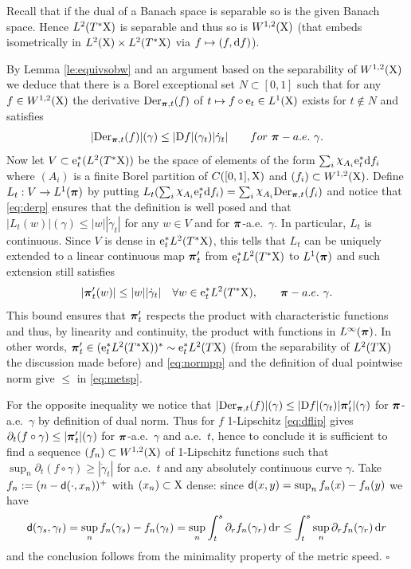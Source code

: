 \documentclass[11pt]{article}
\numberwithin{equation}{section}
\newenvironment{idea}{\removelastskip\par\medskip   %
\noindent{\em Idea of the proof} \rm}{\penalty-20\null\hfill$\square$\par\medbreak}
\newcommand{\ppi}{{\mbox{\boldmath$\pi$}}}
\newcommand{\sppi}{{\mbox{\scriptsize\boldmath$\pi$}}}
\newcommand{\e}{{\rm e}}
\newcommand{\X}{{\rm X}}
\newcommand{\sfd}{{\sf d}}
\renewcommand{\d}{{\rm d}}
\newcommand{\D}{{\rm D}}
\newcommand{\nchi}{{\raise.3ex\hbox{$\chi$}}}
\begin{document}
\begin{idea} Recall that if the dual of a Banach space is separable so is the given Banach space. Hence $L^2(T^*\X)$ is separable and thus so is $W^{1,2}(\X)$ (that embeds isometrically in $L^2(\X)\times L^2(T^*\X)$ via $f\mapsto(f,\d f)$). 

By Lemma \ref{le:equivsobw} and an argument based on the separability of $W^{1,2}(\X)$ we deduce that there is a Borel exceptional set $N\subset[0,1]$ such that for any $f\in W^{1,2}(\X)$ the derivative ${\rm Der}_{\sppi,t}(f)$ of   $t\mapsto f\circ\e_t \in L^1(\X)$  exists for $t\notin N$ and satisfies 
\begin{equation}
\label{eq:derp}
|{\rm Der}_{\sppi,t}(f)|(\gamma)\leq |\D f|(\gamma_t)|\dot\gamma_t|\qquad for\ \ppi-a.e.\ \gamma.
\end{equation}
Now let $V\subset \e_t^*(L^2(T^*\X))$ be the space of elements of the form $\sum_i\nchi_{A_i}\e_t^*\d f_i$ where $(A_i)$ is a finite Borel partition of $C([0,1],\X)$ and $(f_i)\subset W^{1,2}(\X)$. Define $L_t:V\to L^1(\ppi)$ by putting $L_t(\sum_i\nchi_{A_i}\e_t^*\d f_i)=\sum_i\nchi_{A_i}{\rm Der}_{\sppi,t}(f_i)$ and notice that \eqref{eq:derp} ensures that the definition is well posed and that  $|L_t(w)|(\gamma)\leq |w||\dot\gamma_t|$ for any $w\in V$ and  for $\ppi$-a.e.\ $\gamma$. In particular, $L_t$ is continuous. Since $V$ is dense in $\e_t^*L^2(T^*\X)$, this tells that $L_t$ can be uniquely extended to a linear continuous map $\ppi_t'$ from $\e_t^*L^2(T^*\X)$ to $L^1(\ppi)$ and such extension still satisfies 
\begin{equation}
\label{eq:normpp}
|\ppi_t'(w)|\leq |w||\dot\gamma_t|\quad \forall  w\in \e_t^*L^2(T^*\X),\qquad \ppi-a.e.\ \gamma. 
\end{equation}
This bound ensures that $\ppi'_t$ respects the product with characteristic functions and thus, by linearity and continuity, the product with functions in $L^\infty(\ppi)$. In other words, $\ppi_t'\in (\e_t^*L^2(T^*\X))^*\sim \e_t^*L^2(T\X)$ (from the separability of $L^2(T\X)$  the discussion made before) and \eqref{eq:normpp} and the definition of dual pointwise norm give  $\leq$ in \eqref{eq:metsp}.

For the opposite inequality we notice that $|{\rm Der}_{\sppi,t}(f)|(\gamma)\leq |\D f|(\gamma_t)|\ppi'_t|(\gamma)$  for $\ppi$-a.e.\ $\gamma$ by definition of dual norm. Thus for $f$ 1-Lipschitz \eqref{eq:dflip} gives $\partial_t(f\circ\gamma)\leq |\ppi'_t|(\gamma)$ for $\ppi$-a.e.\ $\gamma$ and a.e.\ $t$, hence  to conclude it is sufficient to find a sequence $(f_n)\subset W^{1,2}(\X)$ of 1-Lipschitz functions such that $\sup_n\partial_t(f\circ\gamma)\geq|\dot\gamma_t|$ for a.e.\ $t$ and any absolutely continuous curve $\gamma$. Take $f_n:=(n-\sfd(\cdot,x_n))^+$ with $(x_n)\subset\X$ dense: since $\sfd(x,y)=\sup_nf_n(x)-f_n(y)$ we have
\[
\sfd(\gamma_s,\gamma_t)=\sup_nf_n(\gamma_s)-f_n(\gamma_t)=\sup_n\int_t^s\partial_rf_n(\gamma_r)\,\d r\leq\int_t^s \sup_n\partial_rf_n(\gamma_r)\,\d r
\]
and the conclusion follows from the minimality property of the metric speed.
\end{idea}
\end{document}
